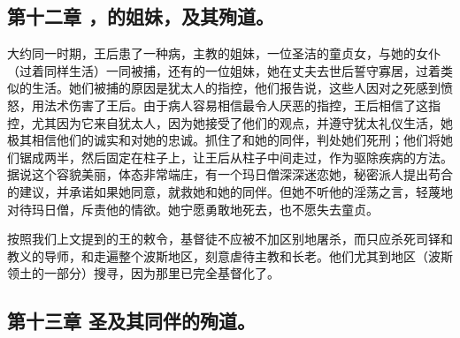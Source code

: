 
\subsection{第十二章   ，的姐妹，及其殉道。}

大约同一时期，王后患了一种病，主教的姐妹，一位圣洁的童贞女，与她的女仆（过着同样生活）一同被捕，还有的一位姐妹，她在丈夫去世后誓守寡居，过着类似的生活。她们被捕的原因是犹太人的指控，他们报告说，这些人因对之死感到愤怒，用法术伤害了王后。由于病人容易相信最令人厌恶的指控，王后相信了这指控，尤其因为它来自犹太人，因为她接受了他们的观点，并遵守犹太礼仪生活，她极其相信他们的诚实和对她的忠诚。抓住了和她的同伴，判处她们死刑；他们将她们锯成两半，然后固定在柱子上，让王后从柱子中间走过，作为驱除疾病的方法。据说这个容貌美丽，体态非常端庄，有一个玛日僧深深迷恋她，秘密派人提出苟合的建议，并承诺如果她同意，就救她和她的同伴。但她不听他的淫荡之言，轻蔑地对待玛日僧，斥责他的情欲。她宁愿勇敢地死去，也不愿失去童贞。\par

按照我们上文提到的王的敕令，基督徒不应被不加区别地屠杀，而只应杀死司铎和教义的导师，和走遍整个波斯地区，刻意虐待主教和长老。他们尤其到地区（波斯领土的一部分）搜寻，因为那里已完全基督化了。\par


\subsection{第十三章  圣及其同伴的殉道。}

